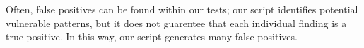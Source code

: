 Often, false positives can be found within our tests; our script 
identifies potential vulnerable patterns, but it does not guarentee
that each individual finding is a true positive. In this way, our script
generates many false positives.




